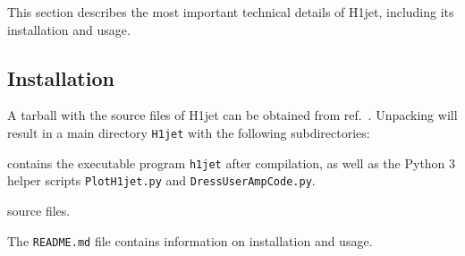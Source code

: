 \documentclass[12pt,a4wide]{article}
\begin{document}
This section describes the most important technical details of H1jet, including its installation and usage. 

\subsection{Installation} 
A tarball with the source files of H1jet can be obtained from ref.~\cite{h1jet}. Unpacking will result in a main directory \texttt{H1jet} with the following subdirectories: 
\begin{description}[labelindent=\parindent, labelwidth =\widthof{\bfseries9999}, leftmargin = !]
	\item[\texttt{bin} :] contains the executable program \texttt{h1jet} after compilation, as well as the Python 3 helper scripts \texttt{PlotH1jet.py} and \texttt{DressUserAmpCode.py}. 
	\item[\texttt{src} :] source files. 
\end{description}
The \texttt{README.md} file contains information on installation and usage. \\
\end{document}
